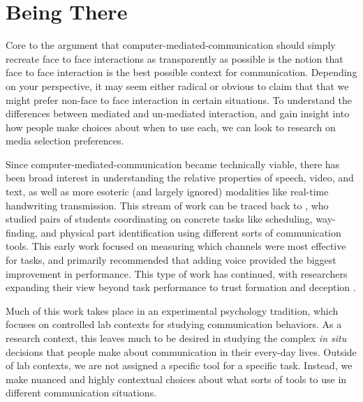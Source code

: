 
\section{Being There}
Core to the argument that computer-mediated-communication should simply recreate face to face interactions as transparently as possible is the notion that face to face interaction is the best possible context for communication. Depending on your perspective, it may seem either radical or obvious to claim that that we might prefer non-face to face interaction in certain situations. To understand the differences between mediated and un-mediated interaction, and gain insight into how people make choices about when to use each, we can look to research on media selection preferences.

Since computer-mediated-communication became technically viable, there has been broad interest in understanding the relative properties of speech, video, and text, as well as more esoteric (and largely ignored) modalities like real-time handwriting transmission. \citep{Williams:1977p682} This stream of work can be traced back to \citet{Ochsman:1974vu}, who studied pairs of students coordinating on concrete tasks like scheduling, way-finding, and physical part identification using different sorts of communication tools. This early work focused on measuring which channels were most effective for tasks, and primarily recommended that adding voice provided the biggest improvement in performance. This type of work has continued, with researchers expanding their view beyond task performance to trust formation \citep{Bos:2002p256}\citep{Toma:2010p347} and deception \citep{Hancock:2004p314}.


Much of this work takes place in an experimental psychology tradition, which focuses on controlled lab contexts for studying communication behaviors. As a research context, this leaves much to be desired in studying the complex \emph{in situ} decisions that people make about communication in their every-day lives. Outside of lab contexts, we are not assigned a specific tool for a specific task. Instead, we make nuanced and highly contextual choices about what sorts of tools to use in different communication situations. 

